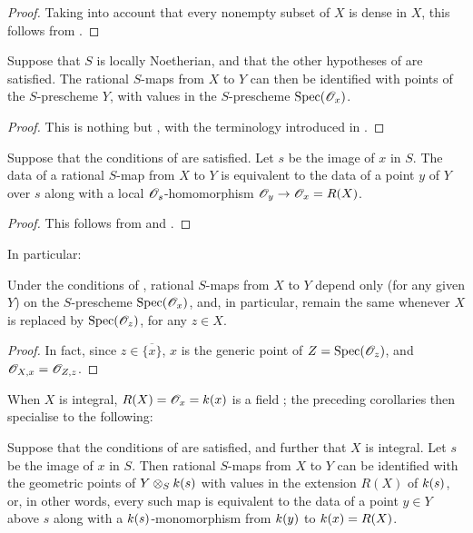 \begin{proof}
\label{proof-1.7.1.11}
Taking into account that every nonempty subset of $X$ is dense in $X$, this follows from .
\end{proof}

\begin{cor}[7.1.12]
\label{1.7.1.12}
Suppose that $S$ is locally Noetherian, and that the other hypotheses of  are satisfied.
The rational $S$-maps from $X$ to $Y$ can then be identified with points of the $S$-prescheme $Y$, with values in the $S$-prescheme ${\mathop{\mathrm{Spec}}\nolimits}(\mathscr{O}_x)$.
\end{cor}

\begin{proof}
\label{proof-1.7.1.12}
This is nothing but , with the terminology introduced in .
\end{proof}

\begin{cor}[7.1.13]
\label{1.7.1.13}
Suppose that the conditions of  are satisfied.
Let $s$ be the image of $x$ in $S$.
The data of a rational $S$-map from $X$ to $Y$ is equivalent to the data of a point $y$ of $Y$ over $s$ along with a local $\mathscr{O}_s$-homomorphism $\OO_y\to\OO_x=R(X)$.
\end{cor}

\begin{proof}
\label{proof-1.7.1.13}
This follows from  and .
\end{proof}

In particular:
\begin{cor}[7.1.14]
\label{1.7.1.14}
Under the conditions of , rational $S$-maps from $X$ to $Y$ depend only (for any given $Y$) on the $S$-prescheme ${\mathop{\mathrm{Spec}}\nolimits}(\mathscr{O}_x)$, and, in particular, remain the same whenever $X$ is replaced by ${\mathop{\mathrm{Spec}}\nolimits}(\mathscr{O}_z)$, for any $z\in X$.
\end{cor}

\begin{proof}
\label{proof-1.7.1.14}
In fact, since $z\in\overline{\{x\}}$, $x$ is the generic point of $Z={\mathop{\mathrm{Spec}}\nolimits}(\mathscr{O}_z)$, and $\mathscr{O}_{X,x}=\mathscr{O}_{Z,z}$.
\end{proof}

When $X$ is integral, $R(X)=\mathscr{O}_x=k(x)$ is a field ; the preceding corollaries then specialise to the following:

\begin{cor}[7.1.15]
\label{1.7.1.15}
Suppose that the conditions of  are satisfied, and further that $X$ is integral.
Let $s$ be the image of $x$ in $S$.
Then rational $S$-maps from $X$ to $Y$ can be identified with the geometric points of $Y\otimes_Sk(s)$ with values in the extension $R(X)$ of $k(s)$, or, in other words, every such map is equivalent to the data of a point $y\in Y$ above $s$ along with a $k(s)$-monomorphism from $k(y)$ to $k(x)=R(X)$.
\end{cor}

